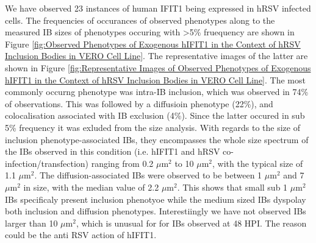 We have observed 23 instances of human IFIT1 being expressed in hRSV infected cells. The frequencies of occurances of observed phenotypes along to the measured IB sizes of phenotypes occuring with >5\% fruequency are shown in Figure \ref{fig:Observed Phenotypes of Exogenous hIFIT1 in the Context of hRSV Inclusion Bodies in VERO Cell Line}. The representative images of the latter are shown in Figure \ref{fig:Representative Images of Observed Phenotypes of Exogenous hIFIT1 in the Context of hRSV Inclusion Bodies in VERO Cell Line}. The most commonly occurng phenotype was intra-IB inclusion, which was observed in 74\% of observations. This was followed by a diffusioin phenotype (22\%), and colocalisation associated with IB exclusion (4\%). Since the latter occured in sub 5\% frequency it was exluded from the size analysis. With regards to the size of inclusion phenotype-associated IBs, they encompasses the whole size spectrum of the IBs observed in this condition (i.e. hIFIT1 and hRSV co-infection/transfection) ranging from 0.2 \(\mu \mbox{m}^2\) to 10 \(\mu \mbox{m}^2\), with the typical size of 1.1 \(\mu \mbox{m}^2\). The diffusion-associated IBs were observed to be between 1 \(\mu \mbox{m}^2\) and 7 \(\mu \mbox{m}^2\) in size, with the median value of 2.2 \(\mu \mbox{m}^2\). This shows that small sub 1 \(\mu \mbox{m}^2\) IBs specificaly present inclusion phenotyoe while the medium sized IBs dyspolay both inclusion and diffusion phenotypes. Interestiingly we have not observed IBs larger than 10 \(\mu \mbox{m}^2\), which is unusual for for IBs observed at 48 HPI. The reason could be the anti RSV action of hIFIT1. 

